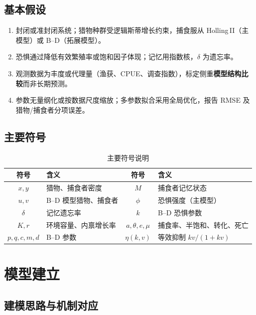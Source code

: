 \documentclass[12pt,a4paper]{ctexart}
\begin{document}
\subsection{基本假设}

\begin{enumerate}[label=H\arabic*.,leftmargin=2em]
  \item 封闭或准封闭系统；猎物种群受逻辑斯蒂增长约束，捕食服从 Holling\,II（主模型）或 B--D（拓展模型）。
  \item 恐惧通过降低有效繁殖率或饱和因子体现；记忆用指数核，$\delta$ 为遗忘率。
  \item 观测数据为丰度或代理量（渔获、CPUE、调查指数），标定侧重\textbf{模型结构比较}而非长期预测。
  \item 参数无量纲化或按数据尺度缩放；多参数拟合采用全局优化，报告 RMSE 及猎物/捕食者分项误差。
\end{enumerate}

\subsection{主要符号}

\begin{table}[H]
  \centering
  \caption{主要符号说明}
  \label{tab:symbols}
  \small
  \begin{tabular}{clcl}
    \toprule
    符号 & 含义 & 符号 & 含义 \\
    \midrule
    $x,y$ & 猎物、捕食者密度 & $M$ & 捕食者记忆状态 \\
    $u,v$ & B--D 模型猎物、捕食者 & $\phi$ & 恐惧强度（主模型） \\
    $\delta$ & 记忆遗忘率 & $k$ & B--D 恐惧参数 \\
    $K,r$ & 环境容量、内禀增长率 & $a,\theta,e,\mu$ & 捕食率、半饱和、转化、死亡 \\
    $p,q,c,m,d$ & B--D 参数 & $\eta(k,v)$ & 等效抑制 $kv/(1+kv)$ \\
    \bottomrule
  \end{tabular}
\end{table}

\section{模型建立}

\subsection{建模思路与机制对应}
\end{document}
